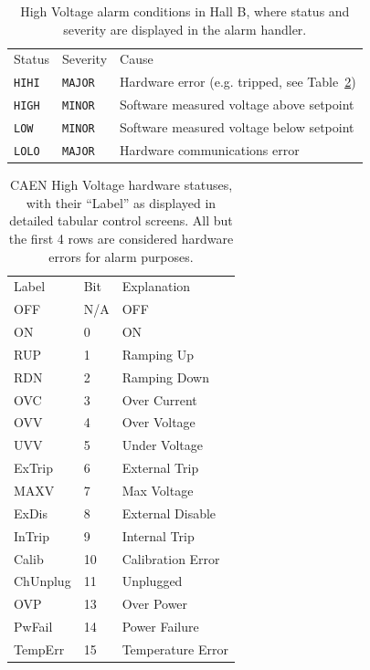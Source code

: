 \documentclass[amsmath,amssymb,notitlepage,11pt]{revtex4}
\begin{document}
\begin{table}[htpb]\centering
  \begin{tabular}{lll} \toprule[1.5pt]
    Status        & Severity & Cause \\ \cmidrule[0.5pt]{1-3}
    \texttt{HIHI} & \texttt{MAJOR} & Hardware error (e.g. tripped, see Table~\ref{tab:hvstat})\\
    \texttt{HIGH} & \texttt{MINOR} & Software measured voltage above setpoint\\
    \texttt{LOW}  & \texttt{MINOR} & Software measured voltage below setpoint\\
    \texttt{LOLO} & \texttt{MAJOR} & Hardware communications error\\
  \bottomrule[1.5pt]
  \end{tabular}
  \caption{High Voltage alarm conditions in Hall B, where status and severity are displayed in the alarm handler.\label{tab:hvalarm}}  
\end{table}

\begin{table}[htpb]\centering
  \begin{tabular}{lll}  \toprule[1.5pt]
    Label    & Bit & Explanation \\ \cmidrule[0.5pt]{1-3}
    OFF      & N/A & OFF\\
    ON       & 0 & ON\\
    RUP      & 1 & Ramping Up\\
    RDN      & 2 & Ramping Down\\
    OVC      & 3 & Over Current\\
    OVV      & 4 & Over Voltage\\
    UVV      & 5 & Under Voltage\\
    ExTrip   & 6 & External Trip\\
    MAXV     & 7 & Max Voltage\\
    ExDis    & 8 & External Disable\\
    InTrip   & 9 & Internal Trip\\
    Calib    & 10 & Calibration Error\\
    ChUnplug & 11 & Unplugged\\
    OVP      & 13 & Over Power\\
    PwFail   & 14 & Power Failure\\
    TempErr  & 15 & Temperature Error\\
    \bottomrule[1.5pt]
  \end{tabular}
  \caption{CAEN High Voltage hardware statuses, with their ``Label'' as displayed in detailed tabular control screens.  All but the first 4 rows are considered hardware errors for alarm purposes.\label{tab:hvstat}}  
\end{table}
\newpage
\end{document}
